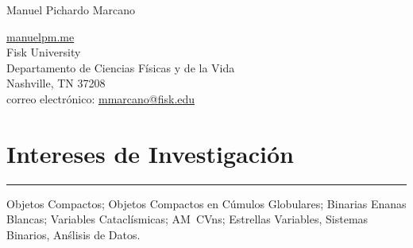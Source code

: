 \documentclass[letterpaper,10pt]{article}
\def\name{Manuel Pichardo Marcano}
\begin{document}
\begin{huge}
\name
\end{huge}





\vspace{.3 cm}



\begin{minipage}{0.6\linewidth}
  \href{www.manuelpm.me}{manuelpm.me} \\
Fisk University \\
  Departamento de Ciencias F\'isicas y de la Vida \\
  Nashville, TN 37208\\
correo electr\'onico:  \href{mailto:mmarcano@fisk.edu}{mmarcano@fisk.edu}\\
\end{minipage}



\section*{Intereses de Investigaci\'on}

\hrule
\vspace{.3 cm}


Objetos Compactos; Objetos Compactos en C\'umulos Globulares; Binarias Enanas Blancas; Variables Catacl\'ismicas; AM~CVns; Estrellas Variables, Sistemas Binarios, An\'slisis de Datos.
\end{document}
